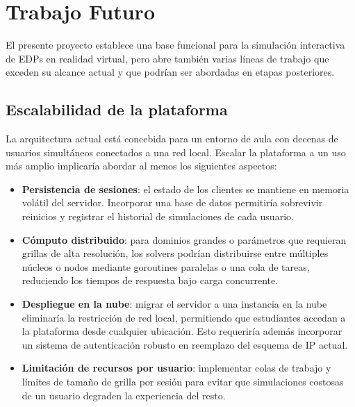 \documentclass[12pt, a4paper]{article}
\begin{document}
\newpage

\section{Trabajo Futuro}


El presente proyecto establece una base funcional para la simulación interactiva de
EDPs en realidad virtual, pero abre también varias líneas de trabajo que exceden su
alcance actual y que podrían ser abordadas en etapas posteriores.

\subsection{Escalabilidad de la plataforma}

La arquitectura actual está concebida para un entorno de aula con decenas de usuarios
simultáneos conectados a una red local. Escalar la plataforma a un uso más amplio
implicaría abordar al menos los siguientes aspectos:

\begin{itemize}
    \item \textbf{Persistencia de sesiones}: el estado de los clientes se mantiene en
    memoria volátil del servidor. Incorporar una base de datos permitiría sobrevivir
    reinicios y registrar el historial de simulaciones de cada usuario.

    \item \textbf{Cómputo distribuido}: para dominios grandes o parámetros que
    requieran grillas de alta resolución, los solvers podrían distribuirse entre
    múltiples núcleos o nodos mediante goroutines paralelas o una cola de tareas,
    reduciendo los tiempos de respuesta bajo carga concurrente.

    \item \textbf{Despliegue en la nube}: migrar el servidor a una instancia en la
    nube eliminaría la restricción de red local, permitiendo que estudiantes accedan
    a la plataforma desde cualquier ubicación. Esto requeriría además incorporar un
    sistema de autenticación robusto en reemplazo del esquema de IP actual.

    \item \textbf{Limitación de recursos por usuario}: implementar colas de trabajo y
    límites de tamaño de grilla por sesión para evitar que simulaciones costosas de
    un usuario degraden la experiencia del resto.
\end{itemize}
\end{document}
